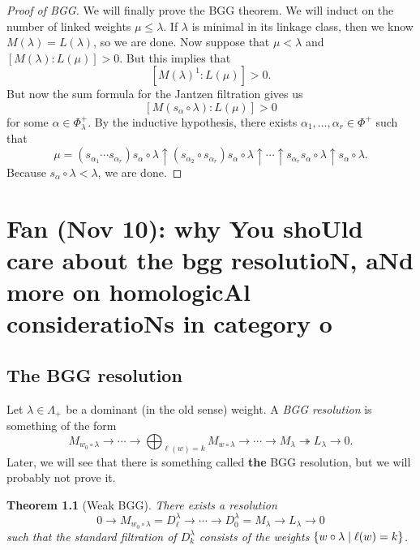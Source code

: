 \documentclass[leqno, openany]{memoir}
\newtheorem{thm}{Theorem}[section]
\theoremstyle{definition}
\theoremstyle{remark}
\theoremstyle{plain}
\theoremstyle{definition}
\theoremstyle{remark}
\begin{document}
\begin{proof}[Proof of BGG]
  We will finally prove the BGG theorem. We will induct on the number of linked weights $\mu \leq \lambda$. If $\lambda$ is minimal in its linkage class, then we know $M(\lambda) = L(\lambda)$, so we are done. Now suppose that $\mu < \lambda$ and $[M(\lambda) : L(\mu)] > 0$. But this implies that
  \[ [ M(\lambda)^1 : L(\mu) ] > 0. \]
  But now the sum formula for the Jantzen filtration gives us
  \[ [M(s_{\alpha} \circ \lambda) : L(\mu)] > 0 \]
  for some $\alpha \in \Phi_{\lambda}^+$. By the inductive hypothesis, there exists $\alpha_1, \ldots, \alpha_r \in \Phi^+$ such that
  \[ \mu = (s_{\alpha_1} \cdots s_{\alpha_r}) s_{\alpha} \circ \lambda \uparrow (s_{\alpha_2} \circ s_{\alpha_r}) s_{\alpha} \circ \lambda \uparrow \cdots \uparrow s_{\alpha_r} s_{\alpha} \circ \lambda \uparrow s_{\alpha} \circ \lambda. \]
  Because $s_{\alpha} \circ \lambda < \lambda$, we are done.
\end{proof}

\chapter{Fan (Nov 10): why You shoUld care about the bgg resolutioN, aNd more on homologicAl consideratioNs in category o}%
\label{cha:fan_nov_10_why_you_should_care_about_the_bgg_resolution_and_more_on_homological_considerations_in_category_o}

\section{The BGG resolution}%
\label{sec:the_bgg_resolution}

Let $\lambda \in \Lambda_+$ be a dominant (in the old sense) weight. A \textit{BGG resolution} is something of the form
\[ M_{w_0 \circ \lambda} \to \cdots \to \bigoplus_{\ell(w) = k} M_{w \circ \lambda} \to \cdots \to M_{\lambda} \twoheadrightarrow L_{\lambda} \to 0. \]
Later, we will see that there is something called \textbf{the} BGG resolution, but we will probably not prove it. 

\begin{thm}[Weak BGG]
    There exists a resolution
    \[ 0 \to M_{w_0 \circ \lambda} = D_{\ell}^{\lambda} \to \cdots \to D_0^{\lambda} = M_{\lambda} \to L_{\lambda} \to 0 \]
    such that the standard filtration of $D_k^{\lambda}$ consists of the weights $\qty{w \circ \lambda \mid \ell(w) = k}$.
\end{thm}
\end{document}
